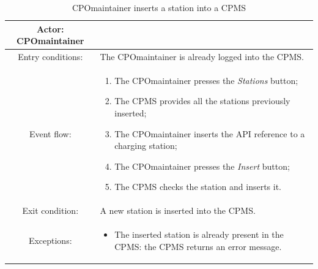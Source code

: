 \begin{table}[h]
    \begin{center}
        \begin{tabular}{|c||p{10cm}|}
            \hline
            Actor: \ac{CPO}maintainer &                                                              \\
            \hline
            Entry conditions:         & The \ac{CPO}maintainer is already logged into the \ac{CPMS}. \\
            \hline
            Event flow:               &
            \begin{enumerate}
                \item The \ac{CPO}maintainer presses the \textit{Stations} button;
                \item The \ac{CPMS} provides all the stations previously inserted;
                \item The \ac{CPO}maintainer inserts the \ac{API} reference to a charging station;
                \item The \ac{CPO}maintainer presses the \textit{Insert} button;
                \item The \ac{CPMS} checks the station and inserts it.
            \end{enumerate}
            \\
            \hline
            Exit condition:           & A new station is inserted into the \ac{CPMS}.                \\
            \hline
            Exceptions:               &
            \begin{itemize}
                \item The inserted station is already present in the \ac{CPMS}: the \ac{CPMS} returns an error message.
            \end{itemize}
            \\
            \hline
        \end{tabular}
    \end{center}
    \caption{\ac{CPO}maintainer inserts a station into a \ac{CPMS}}
\end{table}

